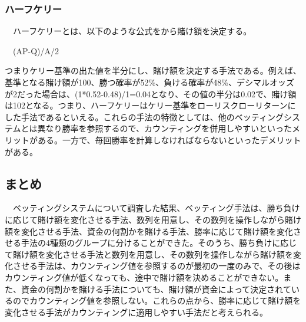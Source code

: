 \subsubsection{ハーフケリー}
　ハーフケリーとは、以下のような公式をから賭け額を決定する。
\begin{center}　(AP-Q)/A/2
\end{center}
つまりケリー基準の出た値を半分にし、賭け額を決定する手法である。例えば、基準となる賭け額が100、勝つ確率が52\%、負ける確率が48\%、デシマルオッズが2だった場合は、(1*0.52-0.48)/1=0.04となり、その値の半分は0.02で、賭け額は102となる。つまり、ハーフケリーはケリー基準をローリスクローリターンにした手法であるといえる。これらの手法の特徴としては、他のベッティングシステムとは異なり勝率を参照するので、カウンティングを併用しやすいといったメリットがある。一方で、毎回勝率を計算しなければならないといったデメリットがある。

\subsection{まとめ}
　ベッティングシステムについて調査した結果、ベッティング手法は、勝ち負けに応じて賭け額を変化させる手法、数列を用意し、その数列を操作しながら賭け額を変化させる手法、資金の何割かを賭ける手法、勝率に応じて賭け額を変化させる手法の4種類のグループに分けることができた。そのうち、勝ち負けに応じて賭け額を変化させる手法と数列を用意し、その数列を操作しながら賭け額を変化させる手法は、カウンティング値を参照するのが最初の一度のみで、その後はカウンティング値が低くなっても、途中で賭け額を決めることができない。また、資金の何割かを賭ける手法についても、賭け額が資金によって決定されているのでカウンティング値を参照しない。これらの点から、勝率に応じて賭け額を変化させる手法がカウンティングに適用しやすい手法だと考えられる。
